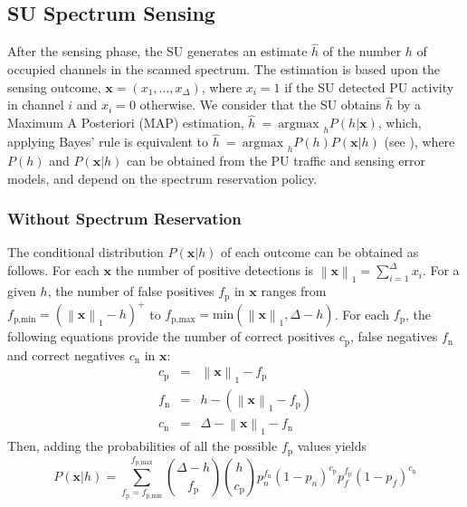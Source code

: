 \subsection{SU Spectrum Sensing}
After the sensing phase, the SU generates an estimate $\hat{h}$ of the number $h$ of occupied channels in the scanned spectrum.
The estimation is based upon the sensing outcome, $\mathbf{x} = \left(x_{1},\dots,x_{\Delta}\right)$, where $x_{i} = 1$ if the SU detected PU activity in channel $i$ and $x_{i} = 0$ otherwise. We consider that the SU obtains $\hat{h}$ by a Maximum A Posteriori (MAP) estimation, $\hat{h}~=~\text{argmax }_{h} P\left(h|\mathbf{x}\right)$, which, applying Bayes' rule is equivalent to $\hat{h}~=~\text{argmax }_{h} P\left(h\right)P\left(\mathbf{x}|h\right)$ (see \cite{ref:Bertsekas}),
where $P\left(h\right)$ and $P\left(\mathbf{x}|h\right)$ can be obtained from the PU traffic and sensing error models, and depend on the spectrum reservation policy.

\subsubsection{Without Spectrum Reservation}
The conditional distribution $P\left(\mathbf{x}|h\right)$ of each outcome can be obtained as follows.
For each $\mathbf{x}$ the number of positive detections is $\left\|\mathbf{x}\right\|_{1}=\sum_{i=1}^{\Delta}x_{i}$.
For a given $h$, the number of false positives $f_{\text{p}}$ in $\mathbf{x}$ ranges from $f_{\text{p,min}}=\left(\left\|\mathbf{x}\right\|_{1}-h\right)^{+}$ to $f_{\text{p,max}}=\text{min}\left(\left\|\mathbf{x}\right\|_{1},\Delta-h\right)$.
For each $f_{\text{p}}$, the following equations provide the number of correct positives $c_{\text{p}}$, false negatives $f_{\text{n}}$ and correct negatives $c_{\text{n}}$ in $\mathbf{x}$:
\begin{equation}
\begin{array}{lcl}
c_{\text{p}} & = & \left\|\mathbf{x}\right\|_{1} - f_{\text{p}}\\
f_{\text{n}} & = & h-\left(\left\|\mathbf{x}\right\|_{1} - f_{\text{p}}\right)\\
c_{\text{n}} & = & \Delta - \left\|\mathbf{x}\right\|_{1} - f_{\text{n}}
\end{array}
\end{equation}
Then, adding the probabilities of all the possible $f_{\text{p}}$ values yields 
\begin{equation}\label{Pxh}
P\left(\mathbf{x}|h\right) = \displaystyle\sum^{f_{\text{p,max}}}_{f_{\text{p}}=f_{\text{p,min}}}
{\Delta-h \choose f_{\text{p}}}{h \choose c_{\text{p}}} p_{n}^{f_{\text{n}}}\left(1-p_{n}\right)^{c_{\text{p}}}p_{f}^{f_{\text{p}}}\left(1-p_{f}\right)^{c_{\text{n}}}
\end{equation}

